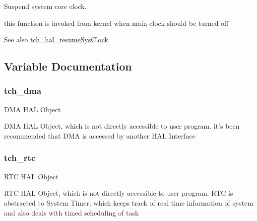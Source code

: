 Suspend system core clock. 

this function is invoked from kernel when main clock should be turned off \begin{DoxySeeAlso}{See also}
\hyperlink{group___base___h_a_l___interface_ga706cac4d6e7ae23025d6833d39156882}{tch\+\_\+hal\+\_\+resume\+Sys\+Clock} 
\end{DoxySeeAlso}


\subsection{Variable Documentation}
\hypertarget{group___base___h_a_l___interface_ga1b84cc3423ad18d5cb1fa7b47228c8c6}{
\subsubsection[{tch\+\_\+dma}]{\setlength{\rightskip}{0pt plus 5cm}tch\+\_\+dma}}\label{group___base___h_a_l___interface_ga1b84cc3423ad18d5cb1fa7b47228c8c6}
D\+M\+A H\+A\+L Object

D\+M\+A H\+A\+L Object, which is not directly accessible to user program. it's been recommended that D\+M\+A is accessed by another H\+A\+L Interface \hypertarget{group___base___h_a_l___interface_ga1bc8ee9a981f8c5a20c70f715341c5b4}{
\subsubsection[{tch\+\_\+rtc}]{\setlength{\rightskip}{0pt plus 5cm}tch\+\_\+rtc}}\label{group___base___h_a_l___interface_ga1bc8ee9a981f8c5a20c70f715341c5b4}
R\+T\+C H\+A\+L Object

R\+T\+C H\+A\+L Object, which is not directly accessible to user program. R\+T\+C is abstracted to System Timer, which keeps track of real time information of system and also deals with timed scheduling of task 